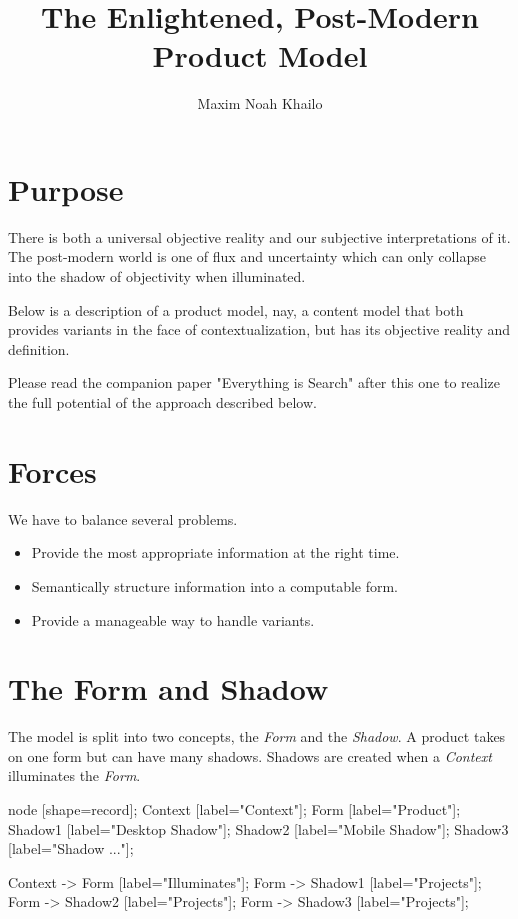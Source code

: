 \documentclass[11pt]{article}
\title{The Enlightened, Post-Modern Product Model}
\author{Maxim Noah Khailo}
\begin{document}
\maketitle
\section{Purpose}

There is both a universal objective reality and our subjective interpretations of 
it. The post-modern world is one of flux and uncertainty which can only collapse
into the shadow of objectivity when illuminated. 

Below is a description of a product model, nay, a content model that both provides
variants in the face of contextualization, but has its objective reality and definition.

Please read the companion paper "Everything is Search" after this one to realize
the full potential of the approach described below.

\section{Forces}

We have to balance several problems.

\begin{itemize}
    \item Provide the most appropriate information at the right time.
    \item Semantically structure information into a computable form.
    \item Provide a manageable way to handle variants.
\end{itemize}

\newpage
\section{The Form and Shadow}

The model is split into two concepts, the \emph{Form} and the \emph{Shadow}. 
A product takes on one form but can have many shadows. Shadows are created when
a \emph{Context} illuminates the \emph{Form}.

 {
    node [shape=record];
    Context [label="Context"];
    Form [label="Product"];
    Shadow1 [label="Desktop Shadow"];
    Shadow2 [label="Mobile Shadow"];
    Shadow3 [label="Shadow ..."];

    Context -> Form [label="Illuminates"];
    Form -> Shadow1 [label="Projects"];
    Form -> Shadow2 [label="Projects"];
    Form -> Shadow3 [label="Projects"];
}
\end{document}
